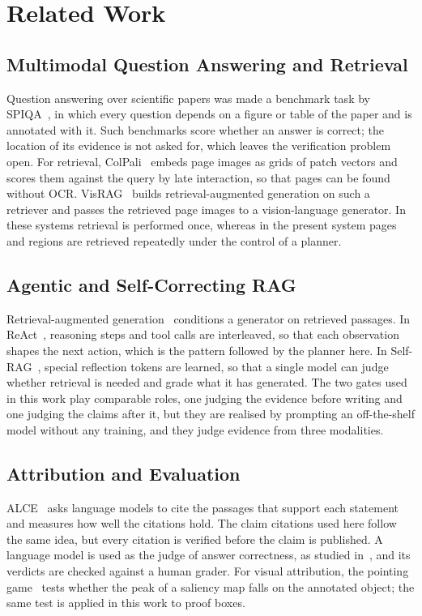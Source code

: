 \section{Related Work}
\label{sec:related}

\subsection{Multimodal Question Answering and Retrieval}

Question answering over scientific papers was made a benchmark task by
SPIQA~\cite{pramanick2024spiqa}, in which every question depends on a figure or table of
the paper and is annotated with it. Such benchmarks score whether an answer is correct;
the location of its evidence is not asked for, which leaves the verification problem
open. For retrieval, ColPali~\cite{faysse2025colpali} embeds page images as grids of
patch vectors and scores them against the query by late interaction, so that pages can
be found without OCR. VisRAG~\cite{yu2024visrag} builds retrieval-augmented generation
on such a retriever and passes the retrieved page images to a vision-language
generator. In these systems retrieval is performed once, whereas in the present system
pages and regions are retrieved repeatedly under the control of a planner.

\subsection{Agentic and Self-Correcting RAG}

Retrieval-augmented generation~\cite{lewis2020rag} conditions a generator on retrieved
passages. In ReAct~\cite{yao2023react}, reasoning steps and tool calls are interleaved,
so that each observation shapes the next action, which is the pattern followed by the
planner here. In Self-RAG~\cite{asai2024selfrag}, special reflection tokens are learned, so that a
single model can judge whether retrieval is needed and grade what it has generated. The two gates used in this work
play comparable roles, one judging the evidence before writing and one judging the
claims after it, but they are realised by prompting an off-the-shelf model without any
training, and they judge evidence from three modalities.

\subsection{Attribution and Evaluation}

ALCE~\cite{gao2023alce} asks language models to cite the passages that support each
statement and measures how well the citations hold. The claim citations used here
follow the same idea, but every citation is verified before the claim is published. A
language model is used as the judge of answer correctness, as studied
in~\cite{zheng2023judge}, and its verdicts are checked against a human grader. For
visual attribution, the pointing game~\cite{zhang2018pointing} tests whether the peak of
a saliency map falls on the annotated object; the same test is applied in this work to
proof boxes.

